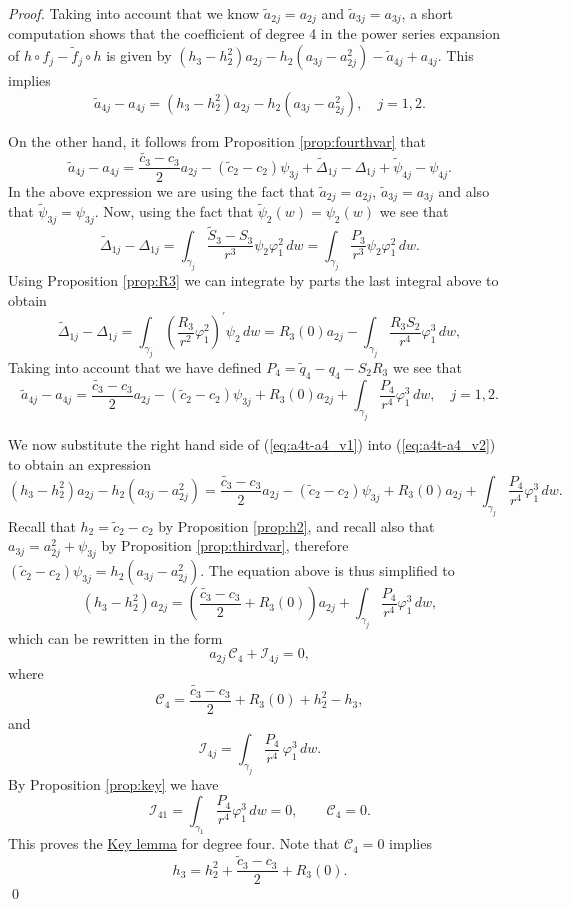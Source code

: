 \begin{proof}
Taking into account that we know $\tilde{a}_{2j}=a_{2j}$ and $\tilde{a}_{3j}=a_{3j}$, a short computation shows that the coefficient of degree 4 in the power series expansion of $h\circ f_j-\tilde{f}_j\circ h$ is given by $(h_3-h_2^2)a_{2j}-h_2(a_{3j}-a_{2j}^2)-\tilde{a}_{4j}+a_{4j}$. This implies
\begin{equation}\label{eq:a4t-a4_v1}
 \tilde{a}_{4j}-a_{4j}=(h_3-h_2^2)a_{2j}-h_2(a_{3j}-a_{2j}^2), \quad j=1,2. 
\end{equation}

On the other hand, it follows from Proposition \ref{prop:fourthvar} that
\[ \tilde{a}_{4j}-a_{4j}=\frac{\tilde{c_3}-c_3}{2}a_{2j}-(\tilde{c}_2-c_2)\psi_{3j}+\widetilde{\Delta}_{1j}-\Delta_{1j}+\widetilde{\psi}_{4j}-\psi_{4j}. \]
In the above expression we are using the fact that $\tilde{a}_{2j}=a_{2j}$, $\tilde{a}_{3j}=a_{3j}$ and also that $\widetilde{\psi}_{3j}=\psi_{3j}$. Now, using the fact that $\widetilde{\psi}_2(w)=\psi_2(w)$ we see that
\[ \widetilde{\Delta}_{1j}-\Delta_{1j}=\int_{\gamma_j}\frac{\widetilde{S}_3-S_3}{r^3}\psi_2\varphi_1^2\,dw=\int_{\gamma_j}\frac{P_3}{r^3}\psi_2\varphi_1^2\,dw. \]
Using Proposition \ref{prop:R3} we can integrate by parts the last integral above to obtain
\begin{equation}\label{formula:Delta1t-Delta1} \widetilde{\Delta}_{1j}-\Delta_{1j}=\int_{\gamma_j}\left(\frac{R_3}{r^2}\varphi_1^2\right)^\prime\psi_2\,dw= R_3(0)a_{2j}-\int_{\gamma_j}\frac{R_3S_2}{r^4}\varphi_1^3\,dw, 
\end{equation}
Taking into account that we have defined $P_4=\tilde{q}_4-q_4-S_2R_3$ we see that
\begin{equation}\label{eq:a4t-a4_v2}
\tilde{a}_{4j}-a_{4j}=\frac{\tilde{c_3}-c_3}{2}a_{2j}-(\tilde{c}_2-c_2)\psi_{3j}+R_3(0)a_{2j}+\int_{\gamma_j}\frac{P_4}{r^4}\varphi_1^3\,dw, \quad j=1,2.
\end{equation}

We now substitute the right hand side of (\ref{eq:a4t-a4_v1}) into (\ref{eq:a4t-a4_v2}) to obtain an expression
\[ (h_3-h_2^2)a_{2j}-h_2(a_{3j}-a_{2j}^2)=\frac{\tilde{c_3}-c_3}{2}a_{2j}-(\tilde{c}_2-c_2)\psi_{3j}+R_3(0)a_{2j}+\int_{\gamma_j}\frac{P_4}{r^4}\varphi_1^3\,dw. \]
Recall that $h_2=\tilde{c}_2-c_2$ by Proposition \ref{prop:h2}, and recall also that $a_{3j}=a_{2j}^2+\psi_{3j}$ by Proposition \ref{prop:thirdvar}, therefore $(\tilde{c}_2-c_2)\psi_{3j}=h_2(a_{3j}-a_{2j}^2)$. The equation above is thus simplified to
\[ (h_3-h_2^2)a_{2j}=\left(\frac{\tilde{c_3}-c_3}{2}+R_3(0)\right)a_{2j}+\int_{\gamma_j}\frac{P_4}{r^4}\varphi_1^3\,dw, \]
which can be rewritten in the form
\[ a_{2j}\,\mathcal{C}_4+\mathcal{I}_{4j}=0, \]
where
\[ \mathcal{C}_4=\frac{\tilde{c_3}-c_3}{2}+R_3(0)+h_2^2-h_3, \]
and
\[ \mathcal{I}_{4j}=\int_{\gamma_j}\frac{P_4}{r^4}\,\varphi_1^3\,dw. \]
By Proposition \ref{prop:key} we have 
\[ \mathcal{I}_{41}=\int_{\gamma_1}\frac{P_4}{r^4}\varphi_1^3\,dw=0, \qquad \mathcal{C}_4=0. \]
This proves the \hyperref[lemma:key]{Key lemma} for degree four. Note that $\mathcal{C}_4=0$ implies
\[ h_3=h_2^2+\frac{\tilde{c}_3-c_3}{2}+R_3(0). \]
\qed\end{proof}

